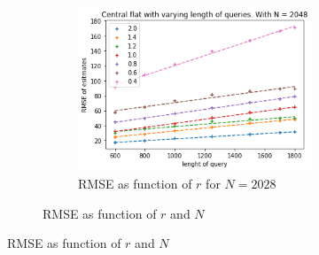 \documentclass[11pt]{article}
\theoremstyle{definition}
\begin{document}
\begin{figure}[H]
\begin{subfigure}{.4\textwidth}
\begin{subfigure}{\textwidth}
  \includegraphics[width=\linewidth]{figures/central_flat/varying_r/cen_flat_varying_length_N_linear_=2048.png}
  \caption{RMSE as function of $r$ for $N=2028$}
  \label{fig:a}
\end{subfigure}
\caption{RMSE as function of $r$ and $N$}
\label{fig:b}
\end{subfigure}
\caption{RMSE as function of $r$ and $N$}
\label{fig:a}
\end{figure}
\end{document}
